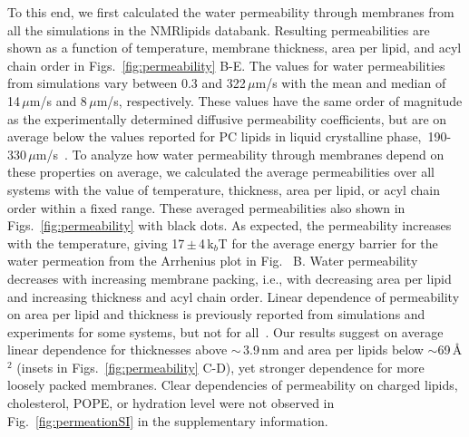 \documentclass[fleqn,10pt]{wlscirep}
\begin{document}
To this end, we first calculated the water permeability through membranes from all the simulations in the NMRlipids databank. Resulting permeabilities are shown as a function of temperature, membrane thickness, area per lipid, and acyl chain order in Figs.~\ref{fig:permeability} B-E. The values for water permeabilities from simulations vary between 0.3 and 322\,$\mu$m/s with the mean and median of 14\,$\mu$m/s and 8\,$\mu$m/s, respectively. These values have the same order of magnitude as the experimentally determined diffusive permeability coefficients, but are on average below the values reported for PC lipids in liquid crystalline phase,~190-330\,$\mu$m/s~\cite{jansen95}. To analyze how water permeability through membranes depend on these properties on average, we calculated the average permeabilities over all systems with the value of temperature, thickness, area per lipid, or acyl chain order within a fixed range. These averaged permeabilities also shown in Figs.~\ref{fig:permeability} with black dots. As expected, the permeability increases with the temperature, giving 17\,$\pm$\,4\,k$_b$T for the average energy barrier for the water permeation from the Arrhenius plot in Fig.~\label{fig:permeability} B. Water permeability decreases with increasing membrane packing, i.e., with decreasing area per lipid and increasing thickness and acyl chain order. Linear dependence of permeability on area per lipid and thickness is previously reported from simulations and experiments for some systems, but not for all~\cite{mathai08,frallicciardi22}. Our results suggest on average linear dependence for thicknesses above $\sim$\,3.9\,nm and area per lipids below $\sim$69\,Å$^2$ (insets in Figs.~\ref{fig:permeability} C-D), yet stronger dependence for more loosely packed membranes. 
Clear dependencies of permeability on charged lipids, cholesterol, POPE, or hydration level were not observed in Fig.~\ref{fig:permeationSI} in the supplementary information.
\end{document}
